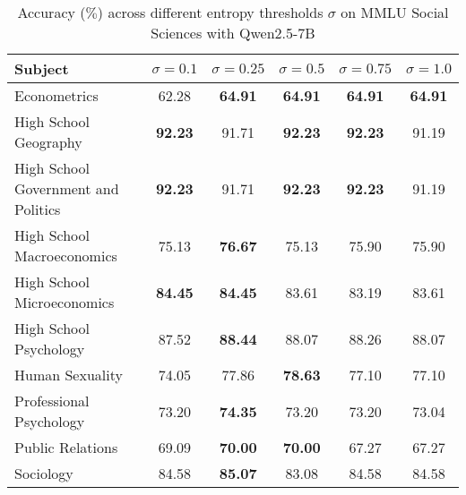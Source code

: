 \begin{table*}[h]
    \centering
    \caption{Accuracy ($\%$) across different entropy thresholds $\sigma$ on MMLU Social Sciences with Qwen2.5-7B}
    \label{tab:qwen_mmlu_social_science_per_sigma}
    \begin{tabular}{lccccc}
        \toprule
        \textbf{Subject}                    & $\sigma=0.1$ & $\sigma=0.25$ & $\sigma=0.5$ & $\sigma=0.75$ & $\sigma=1.0$ \\
        \midrule
        Econometrics                        & 62.28                 & \textbf{64.91}         & \textbf{64.91}        & \textbf{64.91}         & \textbf{64.91}        \\
        High School Geography               & \textbf{92.23}        & 91.71                  & \textbf{92.23}        & \textbf{92.23}         & 91.19                 \\
        High School Government and Politics & \textbf{92.23}        & 91.71                  & \textbf{92.23}        & \textbf{92.23}         & 91.19                 \\
        High School Macroeconomics          & 75.13                 & \textbf{76.67}         & 75.13                 & 75.90                  & 75.90                 \\
        High School Microeconomics          & \textbf{84.45}        & \textbf{84.45}         & 83.61                 & 83.19                  & 83.61                 \\
        High School Psychology              & 87.52                 & \textbf{88.44}         & 88.07                 & 88.26                  & 88.07                 \\
        Human Sexuality                     & 74.05                 & 77.86                  & \textbf{78.63}        & 77.10                  & 77.10                 \\
        Professional Psychology             & 73.20                 & \textbf{74.35}         & 73.20                 & 73.20                  & 73.04                 \\
        Public Relations                    & 69.09                 & \textbf{70.00}         & \textbf{70.00}        & 67.27                  & 67.27                 \\
        Sociology                           & 84.58                 & \textbf{85.07}         & 83.08                 & 84.58                  & 84.58                 \\

\end{tabular}
\end{table*}
